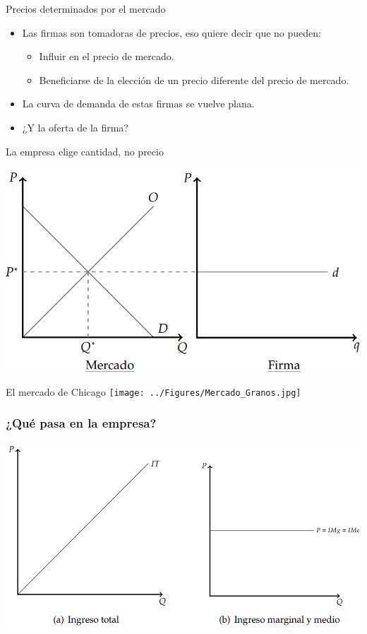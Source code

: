 \documentclass{beamer}
\begin{document}
\begin{frame}{Precios determinados por el mercado}
    \begin{itemize}
        \item Las firmas son tomadoras de precios, eso quiere decir que no pueden:
        \begin{itemize}
            \item Influir en el precio de mercado.
            \item Beneficiarse de la elección de un precio diferente del precio de mercado.
        \end{itemize}
        \item La curva de demanda de estas firmas se vuelve plana.
        \item ¿Y la oferta de la firma?
        \end{itemize}
        \begin{boxA}
            \centering
            La empresa elige cantidad, no precio
        \end{boxA}
        \centering
        \includegraphics[scale=0.4]{../Figures/C21.2.png}
\end{frame}

\begin{frame}{El mercado de Chicago}
    \centering
    \texttt{[image: ../Figures/Mercado\_Granos.jpg]}
\end{frame}

\begin{frame}
\frametitle{¿Qué pasa en la empresa?}
\includegraphics[scale=0.6]{../Figures/C21.4.png}
\end{frame}
\end{document}
